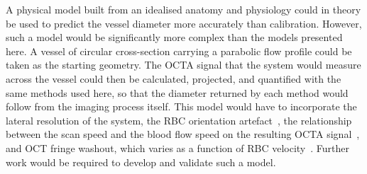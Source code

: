 A physical model built from an idealised anatomy and physiology could in theory be used to predict the vessel diameter more accurately than calibration. However, such a model would be significantly more complex than the models presented here. A vessel of circular cross-section carrying a parabolic flow profile could be taken as the starting geometry. The OCTA signal that the system would measure across the vessel could then be calculated, projected, and quantified with the same methods used here, so that the diameter returned by each method would follow from the imaging process itself. This model would have to incorporate the lateral resolution of the system, the RBC orientation artefact~\cite{cimallaShearFlowinducedOptical2011,bernucciInvestigationArtifactsRetinal2018}, the relationship between the scan speed and the blood flow speed on the resulting OCTA signal~\cite{plonerQuantitativeOpticalCoherence2016}, and OCT fringe washout, which varies as a function of RBC velocity~\cite{yunMotionArtifactsOptical2004,waltherSignalPowerDecrease2010}. Further work would be required to develop and validate such a model.
